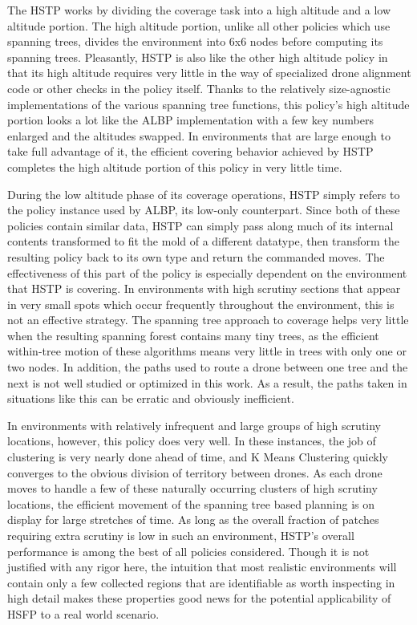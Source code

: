 The HSTP works by dividing the coverage task into a high altitude and a low altitude portion. The high altitude portion, unlike all other policies which use spanning trees, divides the environment into 6x6 nodes before computing its spanning trees. Pleasantly, HSTP is also like the other high altitude policy in that its high altitude requires very little in the way of specialized drone alignment code or other checks in the policy itself. Thanks to the relatively size-agnostic implementations of the various spanning tree functions, this policy's high altitude portion looks a lot like the ALBP implementation with a few key numbers enlarged and the altitudes swapped. In environments that are large enough to take full advantage of it, the efficient covering behavior achieved by HSTP completes the high altitude portion of this policy in very little time.

During the low altitude phase of its coverage operations, HSTP simply refers to the policy instance used by ALBP, its low-only counterpart. Since both of these policies contain similar data, HSTP can simply pass along much of its internal contents transformed to fit the mold of a different datatype, then transform the resulting policy back to its own type and return the commanded moves. The effectiveness of this part of the policy is especially dependent on the environment that HSTP is covering. In environments with high scrutiny sections that appear in very small spots which occur frequently throughout the environment, this is not an effective strategy. The spanning tree approach to coverage helps very little when the resulting spanning forest contains many tiny trees, as the efficient within-tree motion of these algorithms means very little in trees with only one or two nodes. In addition, the paths used to route a drone between one tree and the next is not well studied or optimized in this work. As a result, the paths taken in situations like this can be erratic and obviously inefficient.

In environments with relatively infrequent and large groups of high scrutiny locations, however, this policy does very well. In these instances, the job of clustering is very nearly done ahead of time, and K Means Clustering quickly converges to the obvious division of territory between drones. As each drone moves to handle a few of these naturally occurring clusters of high scrutiny locations, the efficient movement of the spanning tree based planning is on display for large stretches of time. As long as the overall fraction of patches requiring extra scrutiny is low in such an environment, HSTP's overall performance is among the best of all policies considered. Though it is not justified with any rigor here, the intuition that most realistic environments will contain only a few collected regions that are identifiable as worth inspecting in high detail makes these properties good news for the potential applicability of HSFP to a real world scenario.